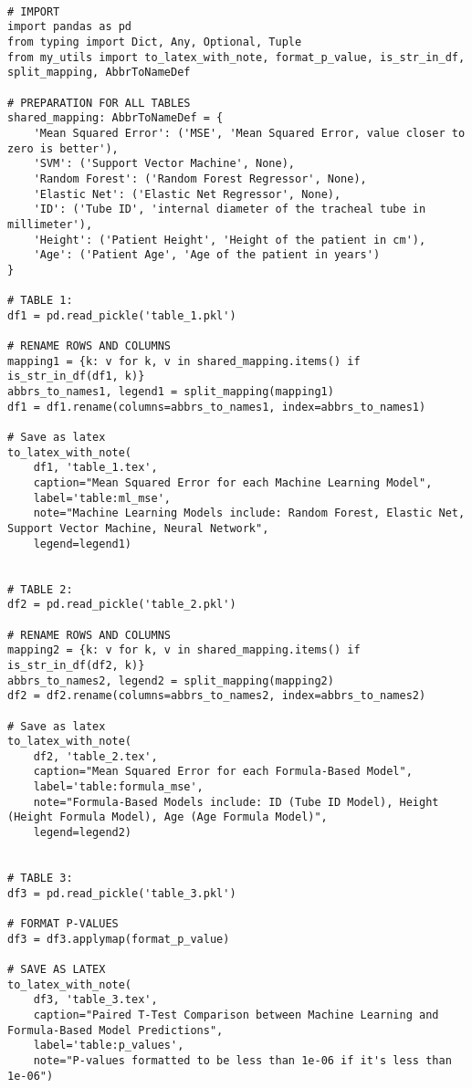 \documentclass[11pt]{article}
\begin{document}
\begin{verbatim}

# IMPORT
import pandas as pd
from typing import Dict, Any, Optional, Tuple
from my_utils import to_latex_with_note, format_p_value, is_str_in_df, split_mapping, AbbrToNameDef

# PREPARATION FOR ALL TABLES
shared_mapping: AbbrToNameDef = {
    'Mean Squared Error': ('MSE', 'Mean Squared Error, value closer to zero is better'),
    'SVM': ('Support Vector Machine', None),
    'Random Forest': ('Random Forest Regressor', None),
    'Elastic Net': ('Elastic Net Regressor', None),
    'ID': ('Tube ID', 'internal diameter of the tracheal tube in millimeter'),
    'Height': ('Patient Height', 'Height of the patient in cm'),
    'Age': ('Patient Age', 'Age of the patient in years')
}

# TABLE 1:
df1 = pd.read_pickle('table_1.pkl')

# RENAME ROWS AND COLUMNS
mapping1 = {k: v for k, v in shared_mapping.items() if is_str_in_df(df1, k)}
abbrs_to_names1, legend1 = split_mapping(mapping1)
df1 = df1.rename(columns=abbrs_to_names1, index=abbrs_to_names1)

# Save as latex
to_latex_with_note(
    df1, 'table_1.tex',
    caption="Mean Squared Error for each Machine Learning Model",
    label='table:ml_mse',
    note="Machine Learning Models include: Random Forest, Elastic Net, Support Vector Machine, Neural Network",
    legend=legend1)


# TABLE 2:
df2 = pd.read_pickle('table_2.pkl')

# RENAME ROWS AND COLUMNS
mapping2 = {k: v for k, v in shared_mapping.items() if is_str_in_df(df2, k)}
abbrs_to_names2, legend2 = split_mapping(mapping2)
df2 = df2.rename(columns=abbrs_to_names2, index=abbrs_to_names2)

# Save as latex
to_latex_with_note(
    df2, 'table_2.tex',
    caption="Mean Squared Error for each Formula-Based Model",
    label='table:formula_mse',
    note="Formula-Based Models include: ID (Tube ID Model), Height (Height Formula Model), Age (Age Formula Model)",
    legend=legend2)


# TABLE 3:
df3 = pd.read_pickle('table_3.pkl')

# FORMAT P-VALUES
df3 = df3.applymap(format_p_value)

# SAVE AS LATEX
to_latex_with_note(
    df3, 'table_3.tex',
    caption="Paired T-Test Comparison between Machine Learning and Formula-Based Model Predictions",
    label='table:p_values',
    note="P-values formatted to be less than 1e-06 if it's less than 1e-06")


\end{verbatim}
\end{document}

